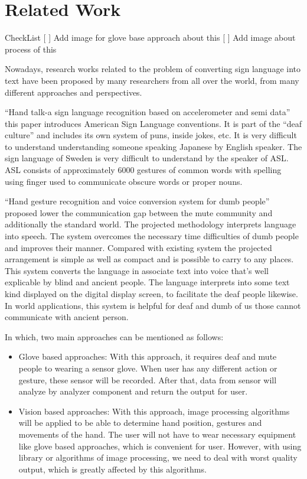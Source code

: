 \chapter{Related Work}
    CheckList
      [ ] Add image for glove base approach about this
      [ ] Add image about process of this

    Nowadays, research works related to the problem of converting sign language into text 
    have been proposed by many researchers from all over the world, from many different 
    approaches and perspectives.

    “Hand talk-a sign language recognition based on
    accelerometer and semi data” this paper introduces American
    Sign Language conventions. It is part of the “deaf culture” and
    includes its own system of puns, inside jokes, etc. It is very
    difficult to understand understanding someone speaking
    Japanese by English speaker. The sign language of Sweden is
    very difficult to understand by the speaker of ASL. ASL
    consists of approximately 6000 gestures of common words
    with spelling using finger used to communicate obscure words
    or proper nouns.

    “Hand gesture recognition and voice conversion system for
    dumb people” proposed lower the communication gap
    between the mute community and additionally the standard
    world. The projected methodology interprets language into
    speech. The system overcomes the necessary time difficulties
    of dumb people and improves their manner. Compared with
    existing system the projected arrangement is simple as well as
    compact and is possible to carry to any places. This system
    converts the language in associate text into voice that's well
    explicable by blind and ancient people. The language
    interprets into some text kind displayed on the digital display
    screen, to facilitate the deaf people likewise. In world
    applications, this system is helpful for deaf and dumb of us
    those cannot communicate with ancient person.

    In which, two main approaches can be mentioned as follows:
    \begin{itemize}
      \item Glove based approaches:
      With this approach, it requires deaf and mute people to wearing a sensor glove. When user
      has any different action or gesture, these sensor will be recorded. After that, data from
      sensor will analyze by analyzer component and return the output for user.
      \item Vision based approaches:
      With this approach, image processing algorithms will be applied to be able to determine
      hand position, gestures and movements of the hand. The user will not have to wear necessary
      equipment like glove based approaches, which is convenient for user. However, with using
      library or algorithms of image processing, we need to deal with worst quality output, which is
      greatly affected by this algorithms.
    \end{itemize}


